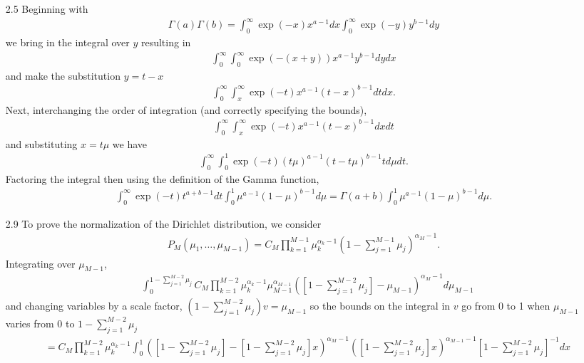 \documentclass[]{article}
\begin{document}
\begin{enumerate}
	\item[2.5] Beginning with
	\begin{align*}
	\Gamma(a)\Gamma(b) = \int_{0}^{\infty}\exp(-x)x^{a-1}dx \int_{0}^{\infty}\exp(-y)y^{b-1}dy
	\end{align*}
	we bring in the integral over $y$ resulting in
	\begin{align*}
	\int_{0}^{\infty} \int_{0}^{\infty} \exp(-(x+y))x^{a-1}y^{b-1}dydx
	\end{align*}
	and make the substitution $y = t - x$
	\begin{align*}
	\int_{0}^{\infty} \int_{x}^{\infty} \exp(-t)x^{a-1}(t-x)^{b-1}dtdx.
	\end{align*}
	Next, interchanging the order of integration (and correctly specifying the bounds),
	\begin{align*}
	\int_{0}^{\infty} \int_{x}^{\infty} \exp(-t)x^{a-1}(t-x)^{b-1}dxdt
	\end{align*}
	and substituting $x = t \mu$ we have
	\begin{align*}
	\int_{0}^{\infty} 	\int_{0}^{1} \exp(-t)(t\mu)^{a-1}(t - t \mu)^{b-1}td\mu dt.
	\end{align*}
	Factoring the integral then using the definition of the Gamma function,
	\begin{align*}
	\int_{0}^{\infty} \exp(-t)t^{a + b - 1}dt \int_{0}^{1}\mu^{a-1}(1-\mu)^{b-1}d \mu = \Gamma(a + b)\int_{0}^{1}\mu^{a-1}(1-\mu)^{b-1}d \mu.
	\end{align*}
	\item[2.9] To prove the normalization of the Dirichlet distribution, we consider
	\begin{align*}
	P_M(\mu_1, \ldots, \mu_{M-1}) = C_M \prod_{k=1}^{M-1} \mu_k^{\alpha_k - 1}\left( 1 - \sum_{j=1}^{M-1} \mu_j \right)^{\alpha_M - 1}.
	\end{align*}
	Integrating over $\mu_{M-1}$,
	\begin{align*}
	& \int_{0}^{1 - \sum_{j=1}^{M-2} \mu_j} C_M \prod_{k=1}^{M-2}\mu_k^{\alpha_k - 1} \mu_{M-1}^{\alpha_{M-1}} \left( \left[1 - \sum_{j=1}^{M-2} \mu_j \right] - \mu_{M-1} \right)^{\alpha_M - 1} d \mu_{M -1}
	\end{align*}
	and changing variables by a scale factor, $\left( 1 - \sum_{j=1}^{M-2} \mu_j \right)v=\mu_{M-1}$ so the bounds on the integral in $v$ go from 0 to 1 when $\mu_{M-1}$ varies from 0 to $1 - \sum_{j=1}^{M-2} \mu_j$
	\begin{align*}
	&= C_M \prod_{k=1}^{M-2}\mu_k^{\alpha_k - 1} \int_{0}^{1} \left( \left[ 1 - \sum_{j=1}^{M-2} \mu_j \right] - \left[ 1 - \sum_{j=1}^{M-2} \mu_j \right]x \right)^{\alpha_M - 1} \left( \left[ 1 - \sum_{j=1}^{M-2} \mu_j \right]x \right)^{\alpha_{M-1}-1} \left[ 1 - \sum_{j=1}^{M-2} \mu_j \right]^{-1} dx \\

\end{align*}
\end{enumerate}
\end{document}
